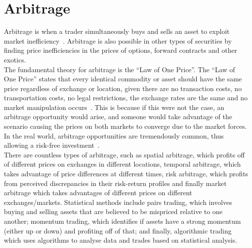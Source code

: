 \section{Arbitrage}
Arbitrage is when a trader simultaneously buys and sells an asset to exploit market inefficiency~\cite{businessinsightsblog_2021}. Arbitrage is also possible in other types of securities by finding price inefficiencies in the prices of options, forward contracts and other exotics.
\\[3mm]
The fundamental theory for arbitrage is the ``Law of One Price''. The ``Law of One Price'' states that every identical commodity or asset should have the same price regardless of exchange or location, given there are no transaction costs, no transportation costs, no legal restrictions, the exchange rates are the same and no market manipulation occurs~\cite{noauthor_law_nodate}. This is because if this were not the case, an arbitrage opportunity would arise, and someone would take advantage of the scenario causing the prices on both markets to converge due to the market forces. In the real world, arbitrage opportunities are tremendously common, thus allowing a risk-free investment~\cite{10.2307/1828075, RICHARDSON1978341}.
\\[3mm]
There are countless types of arbitrage, such as spatial arbitrage, which profits off of different prices on exchanges in different locations, temporal arbitrage, which takes advantage of price differences at different times, risk arbitrage, which profits from perceived discrepancies in their risk-return profiles and finally market arbitrage which takes advantages of different prices on different exchanges/markets. Statistical methods include pairs trading, which involves buying and selling assets that are believed to be mispriced relative to one another; momentum trading, which identifies if assets have a strong momentum (either up or down) and profiting off of that; and finally, algorithmic trading which uses algorithms to analyse data and trades based on statistical analysis.

